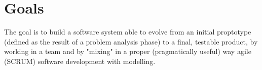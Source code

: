 \section{Goals}
The goal is to build a software system able to evolve from an initial proptotype (defined as the result of a problem analysis phase) to a final, testable product, by working in a team and by "mixing" in a proper (pragmatically useful) way agile (SCRUM) software development with modelling.